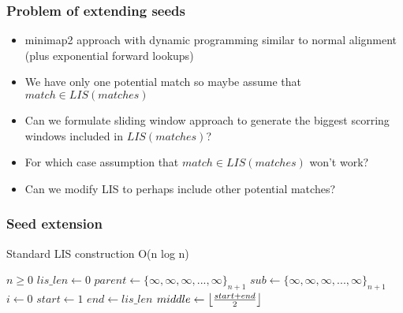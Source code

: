 \documentclass{beamer}
\begin{document}
\begin{frame}
  \frametitle{Problem of extending seeds}

  \begin{itemize}
    \item minimap2 approach with dynamic programming similar to normal alignment (plus exponential forward lookups)
    \item We have only one potential match so maybe assume that $match \in LIS(matches)$
    \item Can we formulate sliding window approach to generate the biggest scorring windows included in $LIS(matches)$?
    \item For which case assumption that $match \in LIS(matches)$ won't work?
    \item Can we modify LIS to perhaps include other potential matches?
  \end{itemize}
\end{frame}

\begin{frame}
  \frametitle{Seed extension}
  
  \begin{algorithm}[H]
      \captionsetup{font=scriptsize}
      \caption{Standard LIS construction O(n log n)}\label{alg:cap}
      \scriptsize
      \begin{algorithmic}
          \Require $n \geq 0$
          \State $lis\_len \gets 0$ 
          \State $parent \gets \{\infty, \infty, \infty, ..., \infty\}_{n+1}$ 
          \State $sub \gets \{\infty, \infty, \infty, ..., \infty\}_{n+1}$ 
          \State $i \gets 0$
           
              \State $start \gets 1$
              \State $end \gets lis\_len$
               
                  \State $middle \gets \floor*{\frac{start + end}{2}}$
                  \Else
                  \EndIf
              \EndWhile
               
              \EndIf
          \EndWhile
      \end{algorithmic}
  \end{algorithm}
\end{frame}
\end{document}
